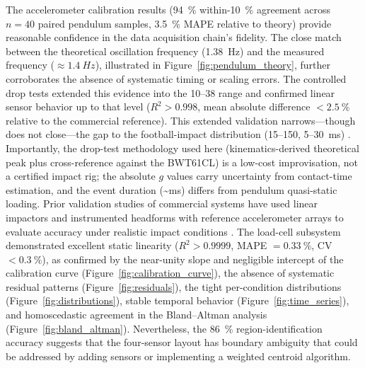 \documentclass[11pt]{article}
\begin{document}
The accelerometer calibration results (\SI{94}{\percent} within-\SI{10}{\percent} agreement across $n = 40$ paired pendulum samples, \SI{3.5}{\percent} MAPE relative to theory) provide reasonable confidence in the data acquisition chain's fidelity. The close match between the theoretical oscillation frequency (\SI{1.38}{Hz}) and the measured frequency ($\approx\SI{1.4}{Hz}$), illustrated in Figure~\ref{fig:pendulum_theory}, further corroborates the absence of systematic timing or scaling errors. The controlled drop tests extended this evidence into the \SI{10}{}--\SI{38}{\gee} range and confirmed linear sensor behavior up to that level ($R^2 > 0.998$, mean absolute difference $< \SI{2.5}{\percent}$ relative to the commercial reference). This extended validation narrows---though does not close---the gap to the football-impact distribution (\SI{15}{}--\SI{150}{\gee}, \SI{5}{}--\SI{30}{ms}) \citep{guskiewicz2007measurement,pellman2003location,crisco2010frequency}. Importantly, the drop-test methodology used here (kinematics-derived theoretical peak plus cross-reference against the BWT61CL) is a low-cost improvisation, not a certified impact rig; the absolute $g$ values carry uncertainty from contact-time estimation, and the event duration (\textasciitilde{}ms) differs from pendulum quasi-static loading. Prior validation studies of commercial systems have used linear impactors and instrumented headforms with reference accelerometer arrays to evaluate accuracy under realistic impact conditions \citep{jadischke2013accuracy,beckwith2020video,bartsch2017modified}. The load-cell subsystem demonstrated excellent static linearity ($R^2 > 0.9999$, MAPE $= \SI{0.33}{\percent}$, CV $< \SI{0.3}{\percent}$), as confirmed by the near-unity slope and negligible intercept of the calibration curve (Figure~\ref{fig:calibration_curve}), the absence of systematic residual patterns (Figure~\ref{fig:residuals}), the tight per-condition distributions (Figure~\ref{fig:distributions}), stable temporal behavior (Figure~\ref{fig:time_series}), and homoscedastic agreement in the Bland--Altman analysis (Figure~\ref{fig:bland_altman}). Nevertheless, the \SI{86}{\percent} region-identification accuracy suggests that the four-sensor layout has boundary ambiguity that could be addressed by adding sensors or implementing a weighted centroid algorithm.
\end{document}
